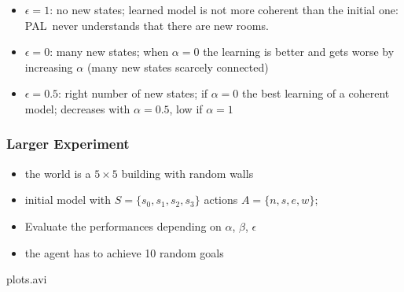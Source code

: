 \documentclass{beamer}
\def\PAL{\textsc{PAL}}
\begin{document}
\begin{frame}
\begin{itemize}
\item<2->[$\bullet$] 
{\color {red} $\epsilon = 1$:} no new states; learned model is not more coherent than the initial one: \PAL\ never understands that there are new rooms.  
\item<3-> [$\bullet$]
{\color {red} $\epsilon = 0$:}  many new states; when $\alpha = 0$ the learning is better and  gets worse by increasing $\alpha$  (many new states
  scarcely connected)
\item<4-> [$\bullet$] 
{\color {red} $\epsilon = 0.5$:} right number of
  new states; if $\alpha = 0$ 
  the best learning of a coherent model; decreases with $\alpha=0.5$, low if $\alpha = 1$
\end{itemize}
\end{frame}






\begin{frame}
\frametitle{Larger Experiment}
\begin{itemize}
\item the world is a $5\times5$ building with random walls
\item initial model with $S=\{s_0,s_1,s_2,s_3\}$ actions $A=\{n,s,e,w\}$;
\item {\color {red}Evaluate the performances depending on $\alpha$, $\beta$, $\epsilon$}
\item the agent has to achieve 10 random goals
\end{itemize}

 \begin{center}
    {plots.avi}
  \end{center}
\end{frame}
\end{document}
